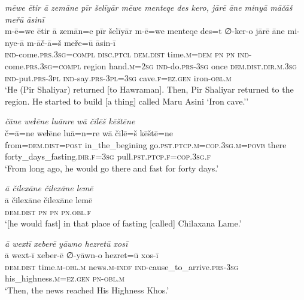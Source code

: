 \ea \label{ŽP.116}
\textit{mēwe ētir ā zemāne pīr šelīyār mēwe menteqe des kero, jārē āne minyā māčāš meřū āsinī} \\ 
\gll m-ē=we ētir ā zemān=e pīr šelīyār m-ē=we menteqe des=t ∅-ker-o jārē āne mi-nye-ā m-āč-ā=š meře=ū āsin-ī \\ 
 \textsc{ind-}come\textsc{.prs}\textsc{.3sg}\textsc{=compl} \textsc{disc.ptcl} \textsc{dem.dist} time\textsc{.m}\textsc{=dem} \textsc{pn} \textsc{pn} \textsc{ind-}come\textsc{.prs}\textsc{.3sg}\textsc{=compl} region hand\textsc{.m}\textsc{=\textsc{2sg}} \textsc{ind-}do\textsc{.prs}\textsc{-3sg} once \textsc{dem.dist}\textsc{.dir}\textsc{.m}\textsc{.3sg} \textsc{ind-}put\textsc{.prs}\textsc{-3pl} \textsc{ind-}say\textsc{.prs}\textsc{-3pl}\textsc{=3sg} cave\textsc{.f}\textsc{\textsc{=ez.gen}} iron\textsc{-obl}\textsc{.m} \\ 
\glt `He (Pir Shaliyar) returned [to Hawraman]. Then, Pir Shaliyar returned to the region. He started to build [a thing] called Maru Asini ‘Iron cave.’'
\z 
 
\ea \label{ŽP.119}
\textit{čāne weɫēne luānre wā čilēš kēštēne} \\ 
\gll č=ā=ne weɫēne luā=n=re wā čilē=š kēštē=ne \\ 
 from=\textsc{dem.dist}\textsc{=\textsc{post}} in\_the\_begining go\textsc{.pst}\textsc{.ptcp}\textsc{.m}\textsc{=cop}\textsc{.3sg}\textsc{.m}\textsc{=\textsc{povb}} there forty\_days\_fasting\textsc{.dir}\textsc{.f}\textsc{=3sg} pull\textsc{.pst}\textsc{.ptcp}\textsc{.f}\textsc{=cop}\textsc{.3sg}\textsc{.f} \\ 
\glt `From long ago, he would go there and fast for forty days.'
\z 
 
\ea \label{ŽP.123}
\textit{ā čilexāne čilexāne lemē} \\ 
\gll ā čilexāne čilexāne lemē \\ 
 \textsc{dem.dist} \textsc{pn} \textsc{pn} \textsc{pn}\textsc{.obl}\textsc{.f} \\ 
\glt `[he would fast] in that place of fasting [called] Chilaxana Lame.'
\z 
 
\ea \label{ŽP.124}
\textit{ā wextī xeberē yāwno hezretū xosī} \\ 
\gll ā wext-ī xeber-ē ∅-yāwn-o hezret=ū xos-ī \\ 
 \textsc{dem.dist} time\textsc{.m}\textsc{-obl}\textsc{.m} news\textsc{.m}\textsc{-indf} \textsc{ind-}cause\_to\_arrive\textsc{.prs}\textsc{-3sg} his\_highness\textsc{.m}\textsc{\textsc{=ez.gen}} \textsc{pn}\textsc{-obl}\textsc{.m} \\ 
\glt `Then, the news reached His Highness Khos.'
\z 
 
